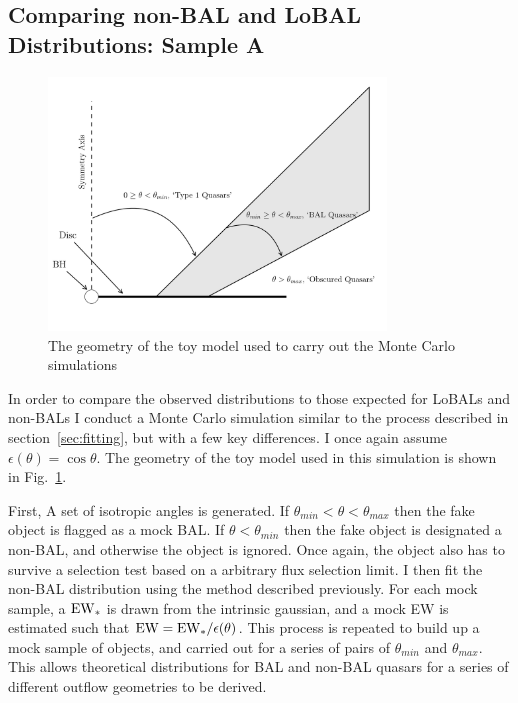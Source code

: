 \subsection{Comparing non-BAL and LoBAL Distributions: Sample A}
\label{sec:bal_v_nonbal}

\begin{figure}
\centering
\includegraphics[width=0.8\textwidth]{figures/ewpaper/fig2_cartoon.png}
\caption
{
The geometry of the toy model used to carry out the Monte Carlo simulations
}
\label{fig:cartoon}
\end{figure}


In order to compare the observed distributions to those expected for LoBALs and
non-BALs I conduct a Monte Carlo simulation similar to
the process described in section~\ref{sec:fitting}, but with a few 
key differences. I once again assume $\epsilon(\theta) = \cos \theta$.
The geometry of the toy model used in this simulation is shown in
Fig.~\ref{fig:cartoon}.

First, A set of isotropic angles is generated.
If $\theta_{min}<\theta<\theta_{max}$ then the fake object 
is flagged as a mock BAL. If $\theta<\theta_{min}$ then the 
fake object is designated a non-BAL, and otherwise
the object is ignored. Once again, the object also has to 
survive a selection test based on a arbitrary flux selection limit.
I then fit the non-BAL distribution using the method described previously.
For each mock sample, a ${\rm EW}_*$ is drawn from the intrinsic gaussian,
and a mock EW is estimated such that ${\rm EW} = {\rm EW}_* / \epsilon(\theta)$.
This process is repeated to build up a mock sample of objects, and 
carried out for a series of pairs of $\theta_{min}$ and $\theta_{max}$.
This allows theoretical distributions for BAL and non-BAL quasars
for a series of different outflow geometries to be derived.

